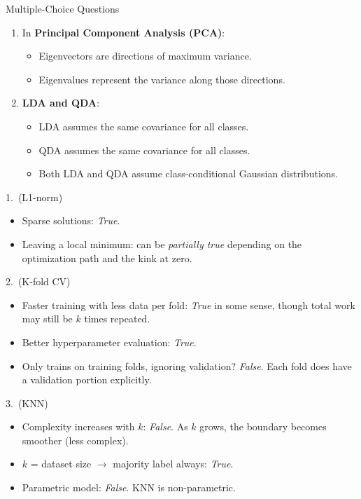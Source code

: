 \documentclass{article}
\begin{document}
\begin{exercise}{Multiple-Choice Questions}
\begin{enumerate}
    \item In \textbf{Principal Component Analysis (PCA)}:
      \begin{itemize}
        \item Eigenvectors are directions of maximum variance.
        \item Eigenvalues represent the variance along those directions.
      \end{itemize}

    \item \textbf{LDA and QDA}:
      \begin{itemize}
        \item LDA assumes the same covariance for all classes.
        \item QDA assumes the same covariance for all classes.
        \item Both LDA and QDA assume class-conditional Gaussian distributions.
      \end{itemize}
  \end{enumerate}

  \begin{solution}
    1.\ (L1-norm)
    \begin{itemize}
      \item Sparse solutions: \emph{True}.
      \item Leaving a local minimum: can be \emph{partially true} depending on the optimization path and the kink at zero.

    \end{itemize}

    2.\ (K-fold CV)
    \begin{itemize}
      \item Faster training with less data per fold: \emph{True} in some sense, though total work may still be $k$ times repeated.
      \item Better hyperparameter evaluation: \emph{True}.
      \item Only trains on training folds, ignoring validation? \emph{False}. Each fold does have a validation portion explicitly.
    \end{itemize}

    3.\ (KNN)
    \begin{itemize}
      \item Complexity increases with $k$: \emph{False}. As $k$ grows, the boundary becomes smoother (less complex).
      \item $k$ = dataset size $\rightarrow$ majority label always: \emph{True}.
      \item Parametric model: \emph{False}. KNN is non-parametric.
    \end{itemize}


\end{solution}
\end{exercise}
\end{document}
